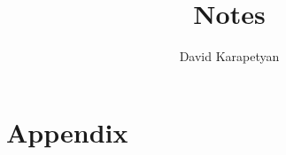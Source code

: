 \documentclass[12pt,reqno]{amsbook}
\numberwithin{section}{chapter}
\numberwithin{equation}{section}  %
\theoremstyle{remark}
\begin{document}
\frontmatter
\title{Notes}
\author{David Karapetyan}

\date{}

\maketitle
\tableofcontents
\mainmatter
%
%
%
%
%
%
%

\part{Appendix}
%

%
\backmatter


%
\end{document}
